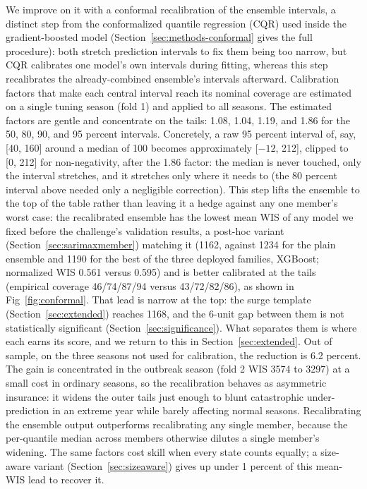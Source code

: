 \documentclass[11pt]{article}
\begin{document}
We improve on it with a conformal recalibration of the ensemble intervals, a distinct step from the
conformalized quantile regression (CQR) used inside the gradient-boosted model
(Section~\ref{sec:methods-conformal}
gives the full procedure): both stretch prediction intervals to fix them being too narrow, but CQR
calibrates one model's own intervals during fitting, whereas this step recalibrates the already-combined
ensemble's intervals afterward. Calibration factors that make each central interval reach its
nominal coverage are estimated on a single tuning season (fold 1) and applied to all seasons. The
estimated factors are gentle and concentrate on the tails: 1.08, 1.04, 1.19, and 1.86 for the 50,
80, 90, and 95 percent intervals. Concretely, a raw 95 percent interval of, say, [40, 160] around a
median of 100 becomes approximately [$-12$, 212], clipped to [0, 212] for non-negativity, after the
1.86 factor: the median is never touched, only the interval stretches, and it stretches only where
it needs to (the 80 percent interval above needed only a negligible correction). This step lifts the
ensemble to the top of the table rather than leaving it a hedge against any one member's worst
case: the recalibrated ensemble has the lowest mean WIS of any model we fixed before the
challenge's validation results, a post-hoc variant (Section~\ref{sec:sarimaxmember}) matching it
(1162, against 1234 for the plain ensemble and 1190 for the best of the three deployed families,
XGBoost; normalized WIS 0.561 versus 0.595) and is better
calibrated at the tails (empirical coverage 46/74/87/94 versus 43/72/82/86), as shown in
Fig~\ref{fig:conformal}. That lead is narrow at the top: the surge template
(Section~\ref{sec:extended}) reaches 1168, and the 6-unit gap between them is not statistically
significant (Section~\ref{sec:significance}). What separates them is where each earns its score,
and we return to this in Section~\ref{sec:extended}. Out of sample, on the three seasons not used for calibration, the reduction
is 6.2 percent. The gain is concentrated in the outbreak season (fold 2 WIS 3574 to 3297) at a small
cost in ordinary seasons, so the recalibration behaves as asymmetric insurance: it widens the outer
tails just enough to blunt catastrophic under-prediction in an extreme year while barely affecting
normal seasons. Recalibrating the ensemble output outperforms recalibrating any single member,
because the per-quantile median across members otherwise dilutes a single member's widening. The
same factors cost skill when every state counts equally; a size-aware variant
(Section~\ref{sec:sizeaware}) gives up under 1 percent of this mean-WIS lead to recover it.
\end{document}
